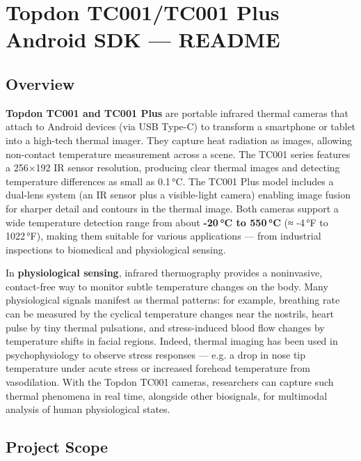 \chapter{Topdon TC001/TC001 Plus Android SDK --- README}

\section{Overview}

\textbf{Topdon TC001 and TC001 Plus} are portable infrared thermal cameras
that attach to Android devices (via USB Type-C) to transform a
smartphone or tablet into a high-tech thermal
imager\cite{Boucsein2012}.
They capture heat radiation as images, allowing non-contact temperature
measurement across a scene. The TC001 series features a 256×192 IR
sensor resolution, producing clear thermal images and detecting
temperature differences as small as
0.1 °C\cite{AppleHealthWatch2019}\cite{SamsungHealth2020}.
The TC001 Plus model includes a dual-lens system (an IR sensor plus a
visible-light camera) enabling image fusion for sharper detail and
contours in the thermal
image\cite{Fowles1981}\cite{SamsungHealth2020}.
Both cameras support a wide temperature detection range from about
\textbf{-20 °C to 550 °C} (≈ -4 °F to
1022 °F)\cite{Healey2005}\cite{Picard2001},
making them suitable for various applications --- from industrial
inspections to biomedical and physiological sensing.

In \textbf{physiological sensing}, infrared thermography provides a
noninvasive, contact-free way to monitor subtle temperature changes on
the
body\cite{DriverStressThermal2020}\cite{GSRFacialThermal2021}.
Many physiological signals manifest as thermal patterns: for example,
breathing rate can be measured by the cyclical temperature changes near
the nostrils, heart pulse by tiny thermal pulsations, and stress-induced
blood flow changes by temperature shifts in facial
regions\cite{StressDefinitionHH}.
Indeed, thermal imaging has been used in psychophysiology to observe
stress responses --- e.g. a drop in nose tip temperature under acute
stress or increased forehead temperature from
vasodilation\cite{CortisolStressIndicator2020}.
With the Topdon TC001 cameras, researchers can capture such thermal
phenomena in real time, alongside other biosignals, for multimodal
analysis of human physiological states.

\section{Project Scope}

